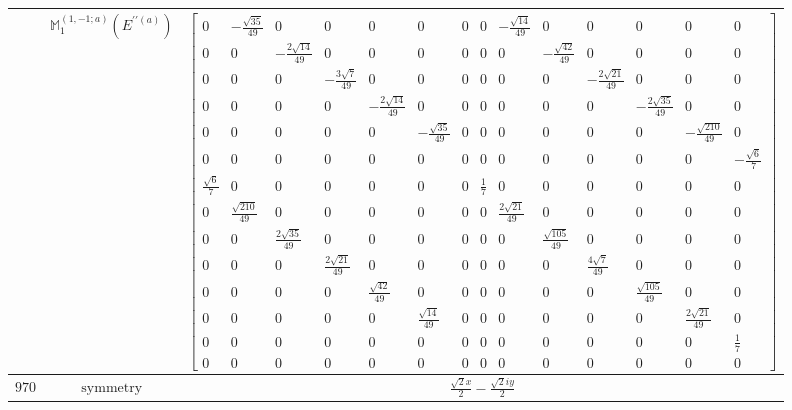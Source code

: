 \documentclass[fleqn,8pt,landscape]{jsarticle}
\begin{document}
\begin{longtable}{ccc}
$  $ & $ \mathbb{M}_{1}^{(1,-1;a)}(E^{\prime\prime(a)}) $ & $ \begin{bmatrix} 0 & - \frac{\sqrt{35}}{49} & 0 & 0 & 0 & 0 & 0 & 0 & - \frac{\sqrt{14}}{49} & 0 & 0 & 0 & 0 & 0 \\ 0 & 0 & - \frac{2 \sqrt{14}}{49} & 0 & 0 & 0 & 0 & 0 & 0 & - \frac{\sqrt{42}}{49} & 0 & 0 & 0 & 0 \\ 0 & 0 & 0 & - \frac{3 \sqrt{7}}{49} & 0 & 0 & 0 & 0 & 0 & 0 & - \frac{2 \sqrt{21}}{49} & 0 & 0 & 0 \\ 0 & 0 & 0 & 0 & - \frac{2 \sqrt{14}}{49} & 0 & 0 & 0 & 0 & 0 & 0 & - \frac{2 \sqrt{35}}{49} & 0 & 0 \\ 0 & 0 & 0 & 0 & 0 & - \frac{\sqrt{35}}{49} & 0 & 0 & 0 & 0 & 0 & 0 & - \frac{\sqrt{210}}{49} & 0 \\ 0 & 0 & 0 & 0 & 0 & 0 & 0 & 0 & 0 & 0 & 0 & 0 & 0 & - \frac{\sqrt{6}}{7} \\ \frac{\sqrt{6}}{7} & 0 & 0 & 0 & 0 & 0 & 0 & \frac{1}{7} & 0 & 0 & 0 & 0 & 0 & 0 \\ 0 & \frac{\sqrt{210}}{49} & 0 & 0 & 0 & 0 & 0 & 0 & \frac{2 \sqrt{21}}{49} & 0 & 0 & 0 & 0 & 0 \\ 0 & 0 & \frac{2 \sqrt{35}}{49} & 0 & 0 & 0 & 0 & 0 & 0 & \frac{\sqrt{105}}{49} & 0 & 0 & 0 & 0 \\ 0 & 0 & 0 & \frac{2 \sqrt{21}}{49} & 0 & 0 & 0 & 0 & 0 & 0 & \frac{4 \sqrt{7}}{49} & 0 & 0 & 0 \\ 0 & 0 & 0 & 0 & \frac{\sqrt{42}}{49} & 0 & 0 & 0 & 0 & 0 & 0 & \frac{\sqrt{105}}{49} & 0 & 0 \\ 0 & 0 & 0 & 0 & 0 & \frac{\sqrt{14}}{49} & 0 & 0 & 0 & 0 & 0 & 0 & \frac{2 \sqrt{21}}{49} & 0 \\ 0 & 0 & 0 & 0 & 0 & 0 & 0 & 0 & 0 & 0 & 0 & 0 & 0 & \frac{1}{7} \\ 0 & 0 & 0 & 0 & 0 & 0 & 0 & 0 & 0 & 0 & 0 & 0 & 0 & 0 \end{bmatrix} $ \\ \hline
$ 970 $ & $ \text{symmetry} $ & $ \frac{\sqrt{2} x}{2} - \frac{\sqrt{2} i y}{2} $ \\

\end{longtable}
\end{document}
